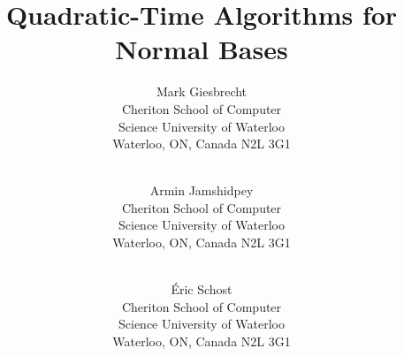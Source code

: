 
\documentclass[noprefixes]{cc}



\usepackage{bbm}

\contact{}%
\submitted{}%
\title{Quadratic-Time Algorithms for Normal Bases}%
\titlehead{Normal Bases}%
\author{
Mark Giesbrecht \\
Cheriton School of Computer\\ Science
University of Waterloo\\ 
Waterloo, ON, Canada  N2L 3G1 \\
\\
\and 
Armin Jamshidpey\\
Cheriton School of Computer\\ Science
University of Waterloo\\ 
Waterloo, ON, Canada  N2L 3G1 \\
\\
\and 
\'Eric Schost \\
Cheriton School of Computer\\ Science
University of Waterloo\\ 
Waterloo, ON, Canada  N2L 3G1 \\
\\
\\
}
